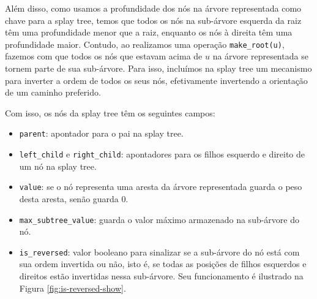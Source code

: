 Além disso, como usamos a profundidade dos nós na árvore representada como chave para a splay tree, temos que todos os nós na sub-árvore esquerda da raiz têm uma profundidade menor que a raiz, enquanto os nós à direita têm uma profundidade maior. Contudo, ao realizamos uma operação \texttt{make\_root(u)}, fazemos com que todos os nós que estavam acima de $u$ na árvore representada se tornem parte de sua sub-árvore. Para isso, incluímos na splay tree um mecanismo para inverter a ordem de todos os seus nós, efetivamente invertendo a orientação de um caminho preferido.

Com isso, os nós da splay tree têm os seguintes campos:

\begin{itemize}
    \item \texttt{parent}: apontador para o pai na splay tree.
    \item \texttt{left\_child} e \texttt{right\_child}: apontadores para os filhos esquerdo e direito de um nó na splay tree.
    \item \texttt{value}: se o nó representa uma aresta da árvore representada guarda o peso desta aresta, senão guarda 0.
    \item \texttt{max\_subtree\_value}: guarda o valor máximo armazenado na sub-árvore do nó.
    \item \texttt{is\_reversed}: valor booleano para sinalizar se a sub-árvore do nó está com sua ordem invertida ou não, isto é, se todas as posições de filhos esquerdos e direitos estão invertidas nessa sub-árvore. Seu funcionamento é ilustrado na Figura \ref{fig:is-reversed-show}.
\end{itemize}

